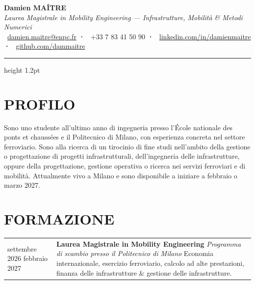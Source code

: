 \documentclass[a4paper,9pt]{extarticle}
\makeatletter
\newcommand{\entry}[4]{%
  \noindent
  \begin{tabularx}{\linewidth}{@{}p{2.6cm}@{\hspace{6pt}}X@{}}
    \small\textcolor{muted}{#1} &
    \textbf{#2} \newline
    \textit{\small\textcolor{muted}{#3}}
    #4
  \end{tabularx}
  \vspace{1pt}
}
\makeatother
\begin{document}
\begin{center}
  {\LARGE\bfseries\color{accent} Damien MAÎTRE}\\[2pt]
  {\normalsize\textit{\textcolor{muted}{Laurea Magistrale in Mobility Engineering — Infrastrutture, Mobilità \& Metodi Numerici}}}\\[4pt]
  \small
  \textcolor{muted}{
    \faEnvelope\ \href{mailto:damien.maitre@enpc.fr}{damien.maitre@enpc.fr}
    \quad\textbf{·}\quad
    \faPhone\ +33 7 83 41 50 90
    \quad\textbf{·}\quad
    \faLinkedin\ \href{https://linkedin.com/in/damienmaitre}{linkedin.com/in/damienmaitre}
    \quad\textbf{·}\quad
    \faGithub\ \href{https://github.com/dammaitre}{github.com/dammaitre}
  }
\end{center}

\vspace{2pt}
{\color{accent}\hrule height 1.2pt}
\vspace{4pt}

\section{PROFILO}

\noindent\small
Sono uno studente all'ultimo anno di ingegneria presso l'École nationale des ponts et chaussées e il Politecnico di Milano, con esperienza concreta nel settore ferroviario. Sono alla ricerca di un tirocinio di fine studi nell'ambito della gestione o progettazione di progetti infrastrutturali, dell'ingegneria delle infrastrutture, oppure della progettazione, gestione operativa o ricerca nei servizi ferroviari e di mobilità. Attualmente vivo a Milano e sono disponibile a iniziare a febbraio o marzo 2027. \par

\section{FORMAZIONE}

\entry{settembre 2026 \newline febbraio 2027}
  {Laurea Magistrale in Mobility Engineering}
  {Programma di scambio presso il Politecnico di Milano}
  {\newline Economia internazionale, esercizio ferroviario, calcolo ad alte prestazioni, finanza delle infrastrutture \& gestione delle infrastrutture.}
\end{document}

